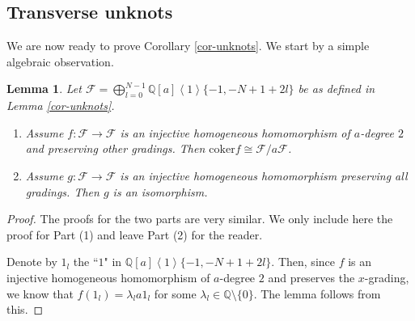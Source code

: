 \documentclass{amsart}
\theoremstyle{plain}
\newtheorem{lemma}[theorem]{Lemma}
\theoremstyle{definition}
\theoremstyle{remark}
\numberwithin{equation}{section}
\begin{document}
\subsection{Transverse unknots} We are now ready to prove Corollary \ref{cor-unknots}. We start by a simple algebraic observation. 

\begin{lemma}\label{lemma-quotient}
Let $\mathcal{F} = \bigoplus_{l=0}^{N-1}{\mathbb{Q}}[a]\left\langle 1\right\rangle \{-1, -N+1+2l\}$ be as defined in Lemma \ref{cor-unknots}. 
\begin{enumerate}
	\item Assume $f:\mathcal{F} \rightarrow \mathcal{F}$ is an injective homogeneous homomorphism of $a$-degree $2$ and preserving other gradings. Then ${\mathrm{coker}} f \cong \mathcal{F}/a\mathcal{F}$.
	\item Assume $g:\mathcal{F} \rightarrow \mathcal{F}$ is an injective homogeneous homomorphism preserving all gradings. Then $g$ is an isomorphism.
\end{enumerate}
\end{lemma}

\begin{proof}
The proofs for the two parts are very similar. We only include here the proof for Part (1) and leave Part (2) for the reader. 

Denote by $1_l$ the ``$1$" in ${\mathbb{Q}}[a]\left\langle 1\right\rangle \{-1, -N+1+2l\}$. Then, since $f$ is an injective homogeneous homomorphism of $a$-degree $2$ and preserves the $x$-grading, we know that $f(1_l) = \lambda_l a 1_l$ for some $\lambda_l \in {\mathbb{Q}} \setminus \{0\}$. The lemma follows from this.
\end{proof}
\end{document}
